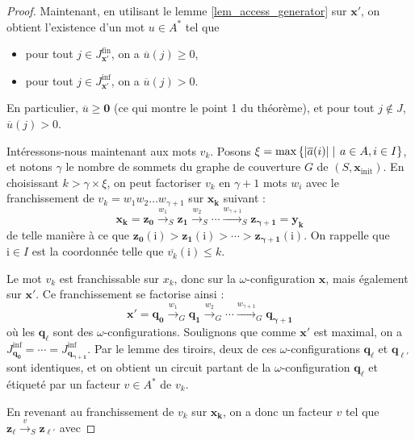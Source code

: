 \documentclass[a4paper,final]{article}
\theoremstyle{definition}
\let\leq\leqslant
\let\geq\geqslant
\newcommand{\set}[2]{\left\{#1\mathrel{\left|\vphantom{#1}\vphantom{#2}\right.}#2\right\}}
\newcommand{\eqfin}{\ensuremath{=_\text{fin}}}
\newcommand{\abs}[1]{\ensuremath{\displaystyle\left\lvert #1 \right\rvert}}
\newcommand{\trans}[2]{\ensuremath{\stackrel{#1}{\longrightarrow}_{#2}}}
\newcommand{\vect}[1]{\ensuremath{\mathbf{#1}}}
\newcommand{\xinit}{\ensuremath{\vect{x}_\text{init}}}
\newcommand{\valeur}[1]{\ensuremath{\overline{#1}}}
\newcommand{\Jfin}[1]{J^\text{fin}_{#1}}
\newcommand{\Jinf}[1]{J^\text{inf}_{#1}}
\begin{document}
\begin{proof}
Maintenant, en utilisant le lemme \ref{lem_access_generator} sur $\vect{x'}$, on obtient l'existence d'un mot $u\in A^*$ tel que 
\begin{itemize}
    \item pour tout $j\in\Jfin{\vect{x'}}$, on a $\valeur{u}(j) \geq 0$,
    \item pour tout $j\in\Jinf{\vect{x'}}$, on a $\valeur{u}(j) > 0$.
\end{itemize}
En particulier, $\valeur{u} \geq \vect{0}$ (ce qui montre le point 1 du théorème), 
et pour tout $j \notin J$, $\valeur{u}(j) > 0$.
\vspace{4mm}

Intéressons-nous maintenant aux mots $v_k$.
Posons $\xi = \max \set{\abs{\valeur{a}(i)}} {a\in A,i\in I}$, et notons $\gamma$ le nombre de sommets du graphe de couverture $G$ de $(S,\xinit)$.
En choisissant $k > \gamma \times \xi$, on peut factoriser $v_k$ en $\gamma + 1$ mots $w_i$ 
avec le franchissement de $v_k = w_1 w_2 \dots w_{\gamma + 1}$ sur $\vect{x_k}$ suivant :
$$\vect{x_k} = \vect{z_0} \trans{w_1}{S} \vect{z_1} \trans{w_2}{S} \cdots \trans{w_{\gamma + 1}}{S} \vect{z_{\gamma + 1}} = \vect{y_k}$$
de telle manière à ce que $\vect{z_0}(\mathrm{i}) > \vect{z_1}(\mathrm{i}) > \cdots > \vect{z_{\gamma + 1}}(\mathrm{i})$.
On rappelle que $\mathrm{i} \in I$ est la coordonnée telle que $\valeur{v_k}(\mathrm{i}) \leq k$.

Le mot $v_k$ est franchissable sur $x_k$, donc sur la $\omega$-configuration $\vect{x}$, mais également sur $\vect{x'}$.
Ce franchissement se factorise ainsi :
$$\vect{x'} = \vect{q_0} \trans{w_1}{G} \vect{q_1} \trans{w_2}{G} \cdots \trans{w_{\gamma + 1}}{G} \vect{q_{\gamma + 1}}$$
où les $\vect{q_\ell}$ sont des $\omega$-configurations.
Soulignons que comme $\vect{x'}$ est maximal, on a $\Jinf{\vect{q_0}} = \cdots = \Jinf{\vect{q_{\gamma+1}}}$.
Par le lemme des tiroirs, deux de ces $\omega$-configurations $\vect{q_\ell}$ et $\vect{q_{\ell'}}$ sont identiques, et on obtient un circuit partant de la $\omega$-configuration $\vect{q_\ell}$ et étiqueté par un facteur $v\in A^*$ de $v_k$.

\vspace{2mm}
En revenant au franchissement de $v_k$ sur $\vect{x_k}$, on a donc un facteur $v$ tel que $\vect{z_\ell} \trans{v}{S} \vect{z_{\ell'}}$ avec


\end{proof}
\end{document}
